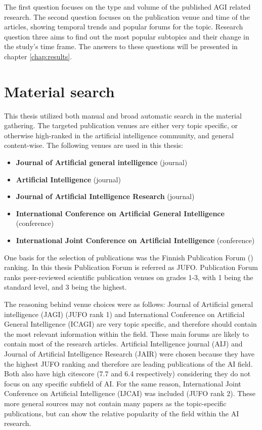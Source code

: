 \documentclass[utf8,english]{gradu3}
\begin{document}
The first question focuses on the type and volume of the published AGI related
research. The second question focuses on the publication venue and time of the
articles, showing temporal trends and popular forums for the topic. Research
question three aims to find out the most popular subtopics and their change in
the study's time frame. The answers to these questions will be presented in
chapter \ref*{chap:results}.


\section{Material search}

This thesis utilized both manual and broad automatic search in the material
gathering. The targeted publication venues are either very topic specific, or
otherwise high-ranked in the artificial intelligence community, and general
content-wise. The following venues are used in this thesis:

\begin{itemize}
  \item \textbf{Journal of Artificial general intelligence} (journal)
  \item \textbf{Artificial Intelligence} (journal)
  \item \textbf{Journal of Artificial Intelligence Research} (journal)
  \item \textbf{International Conference on Artificial General Intelligence}
        (conference)
  \item \textbf{International Joint Conference on Artificial Intelligence}
        (conference)
\end{itemize}

One basis for the selection of publications was the Finnish Publication Forum
(\cite{jufo}) ranking. In this thesis Publication Forum is referred as JUFO.
Publication Forum ranks peer-reviewed scientific publication venues on grades
1-3, with 1 being the standard level, and 3 being the highest.

The reasoning behind venue choices were as follows: Journal of Artificial
general intelligence (JAGI) (JUFO rank 1) and International Conference on
Artificial General Intelligence (ICAGI) are very topic specific, and therefore
should contain the most relevant information within the field. These main forums
are likely to contain most of the research articles. Artificial Intelligence
journal (AIJ) and Journal of Artificial Intelligence Research (JAIR) were chosen
because they have the highest JUFO ranking and therefore are leading
publications of the AI field. Both also have high citescore (7.7 and 6.4
respectively) considering they do not focus on any specific subfield of AI. For
the same reason, International Joint Conference on Artificial Intelligence
(IJCAI) was included (JUFO rank 2). These more general sources may not contain
many papers as the topic-specific publications, but can show the relative
popularity of the field within the AI research.
\end{document}
